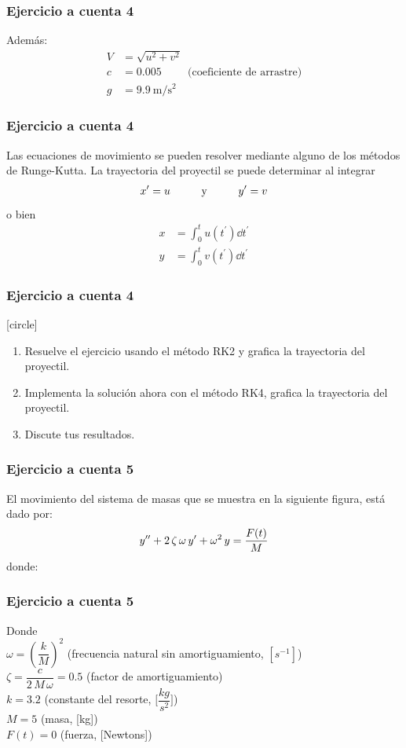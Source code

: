 \begin{frame}
\frametitle{Ejercicio a cuenta 4}
Además:
\begin{align*}
V & = \sqrt{u^{2} + v^{2}} \\[0.5em]
c & = 0.005  \hspace{1cm} \text{(coeficiente de arrastre)} \\[0.5em]
g & = \SI{9.9}{\meter\per\square\second}
\end{align*}
\end{frame}
\begin{frame}
\frametitle{Ejercicio a cuenta 4}
Las ecuaciones de movimiento se pueden resolver mediante alguno de los métodos de Runge-Kutta. La trayectoria del proyectil se puede determinar al integrar
\begin{align*}
{x}^{\prime} = u \hspace{1cm} \mbox{y} \hspace{1cm} {y}^{\prime} = v
\end{align*}
o bien
\begin{align*}
x & = \int^{t}_{0} u(t^{\prime}) \dd{t^{\prime}} \\[0.5em]
y & = \int^{t}_{0} v(t^{\prime}) \dd{t^{\prime}}
\end{align*}
\end{frame}
\begin{frame}
\frametitle{Ejercicio a cuenta 4}
[circle]
\begin{enumerate}[<+->]
\item Resuelve el ejercicio usando el método RK2 y grafica la trayectoria del proyectil.
\item Implementa la solución ahora con el método RK4, grafica la trayectoria del proyectil.
\item Discute tus resultados.
\end{enumerate}
\end{frame}
\begin{frame}
\frametitle{Ejercicio a cuenta 5}
El movimiento del sistema de masas que se muestra en la siguiente figura, está dado por:
\begin{align*}
{y}^{\prime \prime} + 2 \, \zeta \, \omega \, {y}^{\prime} + \omega^{2} \, y = \dfrac{F(t)}{M}
\end{align*}
donde:
\end{frame}
\begin{frame}
\frametitle{Ejercicio a cuenta 5}
Donde \\
$\omega = \left( \dfrac{k}{M} \right)^{2}$ (frecuencia natural sin amortiguamiento, $[s^{-1}]$) \\
$\zeta = \dfrac{c}{2 \, M \, \omega} = 0.5$ (factor de amortiguamiento) \\
$k = 3.2$ (constante del resorte, $\big[ \dfrac{kg}{s^{2}} \big]$) \\
$M = 5$ (masa, [kg]) \\
$F(t) = 0$ (fuerza, [Newtons])
\end{frame}
